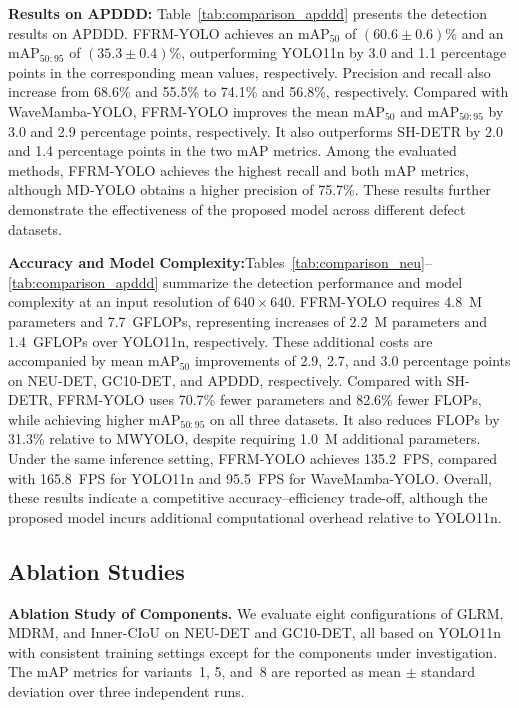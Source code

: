 \documentclass[pdflatex,sn-nature]{sn-jnl}
\begin{document}
\noindent\textbf{Results on APDDD:} Table~\ref{tab:comparison_apddd} presents the detection results on APDDD. FFRM-YOLO achieves an $\mathrm{mAP}_{50}$ of $(60.6 \pm 0.6)\%$ and an $\mathrm{mAP}_{50:95}$ of $(35.3 \pm 0.4)\%$, outperforming YOLO11n by 3.0 and 1.1 percentage points in the corresponding mean values, respectively. Precision and recall also increase from 68.6\% and 55.5\% to 74.1\% and 56.8\%, respectively. Compared with WaveMamba-YOLO, FFRM-YOLO improves the mean $\mathrm{mAP}_{50}$ and $\mathrm{mAP}_{50:95}$ by 3.0 and 2.9 percentage points, respectively. It also outperforms SH-DETR by 2.0 and 1.4 percentage points in the two mAP metrics. Among the evaluated methods, FFRM-YOLO achieves the highest recall and both mAP metrics, although MD-YOLO obtains a higher precision of 75.7\%. These results further demonstrate the effectiveness of the proposed model across different defect datasets.



\noindent\textbf{Accuracy and Model Complexity:}Tables~\ref{tab:comparison_neu}--\ref{tab:comparison_apddd} summarize the detection performance and model complexity at an input resolution of $640 \times 640$. FFRM-YOLO requires 4.8~M parameters and 7.7~GFLOPs, representing increases of 2.2~M parameters and 1.4~GFLOPs over YOLO11n, respectively. These additional costs are accompanied by mean $\mathrm{mAP}_{50}$ improvements of 2.9, 2.7, and 3.0 percentage points on NEU-DET, GC10-DET, and APDDD, respectively. Compared with SH-DETR, FFRM-YOLO uses 70.7\% fewer parameters and 82.6\% fewer FLOPs, while achieving higher $\mathrm{mAP}_{50:95}$ on all three datasets. It also reduces FLOPs by 31.3\% relative to MWYOLO, despite requiring 1.0~M additional parameters. Under the same inference setting, FFRM-YOLO achieves 135.2~FPS, compared with 165.8~FPS for YOLO11n and 95.5~FPS for WaveMamba-YOLO. Overall, these results indicate a competitive accuracy--efficiency trade-off, although the proposed model incurs additional computational overhead relative to YOLO11n.

\FloatBarrier

\subsection{Ablation Studies}

\noindent\textbf{Ablation Study of Components.} We evaluate eight configurations of GLRM, MDRM, and Inner-CIoU on NEU-DET and GC10-DET, all based on YOLO11n with consistent training settings except for the components under investigation. The mAP metrics for variants~1, 5, and~8 are reported as mean $\pm$ standard deviation over three independent runs.
\end{document}
